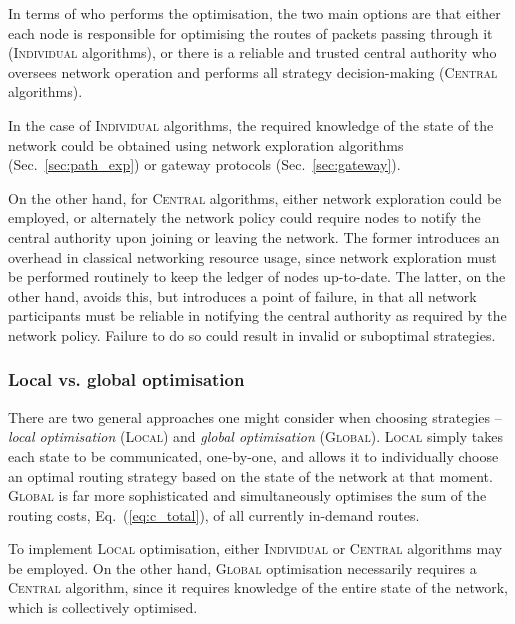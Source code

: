 \documentclass[aps,rmp,twocolumn,amsmath,amssymb,nofootinbib,superscriptaddress,longbibliography,floatfix,table-of-contents,eqsecnum]{revtex4-1}
\begin{document}
In terms of who performs the optimisation, the two main options are that either each node is responsible for optimising the routes of packets passing through it (\textsc{Individual} algorithms), or there is a reliable and trusted central authority who oversees network operation and performs all strategy decision-making (\textsc{Central} algorithms).

In the case of \textsc{Individual} algorithms, the required knowledge of the state of the network could be obtained using network exploration algorithms (Sec.~\ref{sec:path_exp}) or gateway protocols (Sec.~\ref{sec:gateway}). 

On the other hand, for \textsc{Central} algorithms, either network exploration could be employed, or alternately the network policy could require nodes to notify the central authority upon joining or leaving the network. The former introduces an overhead in classical networking resource usage, since network exploration must be performed routinely to keep the ledger of nodes up-to-date. The latter, on the other hand, avoids this, but introduces a point of failure, in that all network participants must be reliable in notifying the central authority as required by the network policy. Failure to do so could result in invalid or suboptimal strategies.

%
%

\subsubsection{Local vs. global optimisation} 

There are two general approaches one might consider when choosing strategies -- \textit{local optimisation} (\textsc{Local}) and \textit{global optimisation} (\textsc{Global}). \textsc{Local} simply takes each state to be communicated, one-by-one, and allows it to individually choose an optimal routing strategy based on the state of the network at that moment. \textsc{Global} is far more sophisticated and simultaneously optimises the sum of the routing costs, Eq.~(\ref{eq:c_total}), of all currently in-demand routes.

To implement \textsc{Local} optimisation, either \textsc{Individual} or \textsc{Central} algorithms may be employed. On the other hand, \textsc{Global} optimisation necessarily requires a \textsc{Central} algorithm, since it requires knowledge of the entire state of the network, which is collectively optimised.
\end{document}
